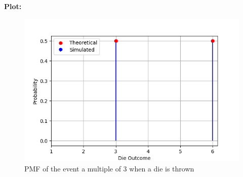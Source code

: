 \documentclass[journal]{IEEEtran}
\begin{document}
\textbf{Plot:}\\
\begin{figure}[h!]
   \centering
   \includegraphics[width=1\columnwidth]{figs/fig.png}
   \caption{PMF of the event a multiple of 3 when a die is thrown}
\end{figure}
\end{document}

